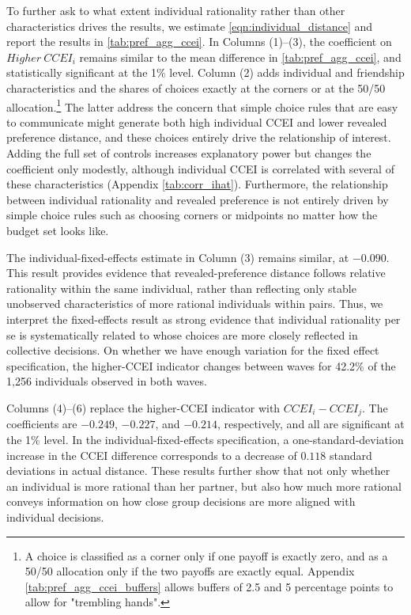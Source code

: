 \documentclass[11 pt]{article}
\begin{document}
To further ask to what extent individual rationality rather than other characteristics drives the results, we estimate \autoref{eqn:individual_distance} and report the results in \autoref{tab:pref_agg_ccei}. In Columns (1)--(3), the coefficient on $Higher\ CCEI_i$ remains similar to the mean difference in \autoref{tab:pref_agg_ccei}, and statistically significant at the 1\% level. Column (2) adds individual and friendship characteristics and the shares of choices exactly at the corners or at the 50/50 allocation.\footnote{A choice is classified as a corner only if one payoff is exactly zero, and as a 50/50 allocation only if the two payoffs are exactly equal. Appendix \autoref{tab:pref_agg_ccei_buffers} allows buffers of 2.5 and 5 percentage points to allow for "trembling hands".} The latter address the concern that simple choice rules that are easy to communicate might generate both high individual CCEI and lower revealed preference distance, and these choices entirely drive the relationship of interest. Adding the full set of controls increases explanatory power but changes the coefficient only modestly, although individual CCEI is correlated with several of these characteristics (Appendix \autoref{tab:corr_ihat}). Furthermore, the relationship between individual rationality and revealed preference is not entirely driven by simple choice rules such as choosing corners or midpoints no matter how the budget set looks like.

The individual-fixed-effects estimate in Column (3) remains similar, at $-0.090$. This result provides evidence that revealed-preference distance follows relative rationality within the same individual, rather than reflecting only stable unobserved characteristics of more rational individuals within pairs. Thus, we interpret the fixed-effects result as strong evidence that individual rationality per se is systematically related to whose choices are more closely reflected in collective decisions. On whether we have enough variation for the fixed effect specification, the higher-CCEI indicator changes between waves for 42.2\% of the 1,256 individuals observed in both waves.

Columns (4)--(6) replace the higher-CCEI indicator with $CCEI_i-CCEI_j$. The coefficients are $-0.249$, $-0.227$, and $-0.214$, respectively, and all are significant at the 1\% level. In the individual-fixed-effects specification, a one-standard-deviation increase in the CCEI difference corresponds to a decrease of $0.118$ standard deviations in actual distance. These results further show that not only whether an individual is more rational than her partner, but also how much more rational conveys information on how close group decisions are more aligned with individual decisions.
\end{document}
